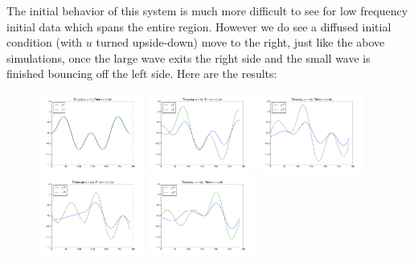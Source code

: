 \documentclass{article} %
\theoremstyle{plain}
\numberwithin{equation}{section} %
\numberwithin{figure}{section} %
\numberwithin{table}{section} %
\begin{document}
\begin{enumerate}[\ \ (a)]
        The initial behavior of this system is much more difficult to see for low frequency initial data which spans the entire region.  However we do see a diffused initial condition (with $u$ turned upside-down) move to the right, just like the above simulations, once the large wave exits the right side and the small wave is finished bouncing off the left side.  Here are the results:
        \begin{figure}[ht!]
            \centering
            \includegraphics[width=0.31\textwidth]{figures/problem_1_c_000.png}
            \includegraphics[width=0.31\textwidth]{figures/problem_1_c_008.png}
            \includegraphics[width=0.31\textwidth]{figures/problem_1_c_016.png}
            \includegraphics[width=0.31\textwidth]{figures/problem_1_c_024.png}
            \includegraphics[width=0.31\textwidth]{figures/problem_1_c_032.png}

\end{figure}
\end{enumerate}
\end{document}
